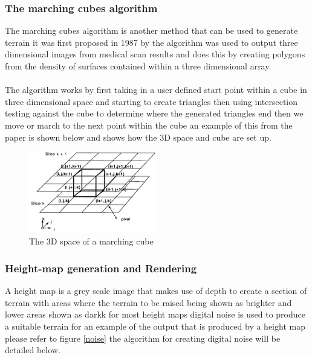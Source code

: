 \subsubsection{The marching cubes algorithm}
The marching cubes algorithm is another method that can be used to generate terrain it was first proposed in 1987 by \cite{marching} the algorithm was used to output three dimensional images from medical scan results and does this by creating polygons from the density of surfaces contained within a three dimensional array.\\\\The algorithm works by first taking in a user defined start point within a cube in three dimensional space and starting to create triangles then using intersection testing against the cube to determine where the generated triangles end then we move or march to the next point within the cube an example of this from the paper \cite{marching} is shown below and shows how the 3D space and cube are set up.     

\begin{figure}[ht!]
	\includegraphics[width=0.5\textwidth]{images/Marchingcubes}
	\caption{The 3D space of a marching cube}	 \label{cube}
\end{figure}

\subsubsection{Height-map generation and Rendering}
A height map is a grey scale image that makes use of depth to create a section of terrain with areas where the terrain to be raised being shown as brighter and lower areas shown as darkk for most height maps digital noise is used to produce a suitable terrain for an example of the output that is produced by a height map please refer to figure \ref{noise} the algorithm for creating digital noise will be detailed below. 

